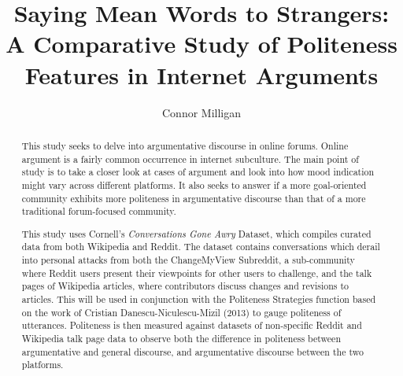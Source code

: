 \documentclass{article}
\title{Saying Mean Words to Strangers: A Comparative Study of Politeness Features in Internet Arguments}
\author{Connor Milligan}
\begin{document}
\maketitle

\begin{abstract}
This study seeks to delve into argumentative discourse in online forums. Online argument is a fairly common occurrence in internet subculture. The main point of study is to take a closer look at cases of argument and look into how mood indication might vary across different platforms. It also seeks to answer if a more goal-oriented community exhibits more politeness in argumentative discourse than that of a more traditional forum-focused community.

This study uses Cornell's \textit{Conversations Gone Awry} Dataset, which compiles curated data from both Wikipedia and Reddit. The dataset contains conversations which derail into personal attacks from both the ChangeMyView Subreddit, a sub-community where Reddit users present their viewpoints for other users to challenge, and the talk pages of Wikipedia articles, where contributors discuss changes and revisions to articles. This will be used in conjunction with the Politeness Strategies function based on the work of Cristian Danescu-Niculescu-Mizil (2013) to gauge politeness of utterances. Politeness is then measured against datasets of non-specific Reddit and Wikipedia talk page data to observe both the difference in politeness between argumentative and general discourse, and argumentative discourse between the two platforms.\end{abstract}
\end{document}
